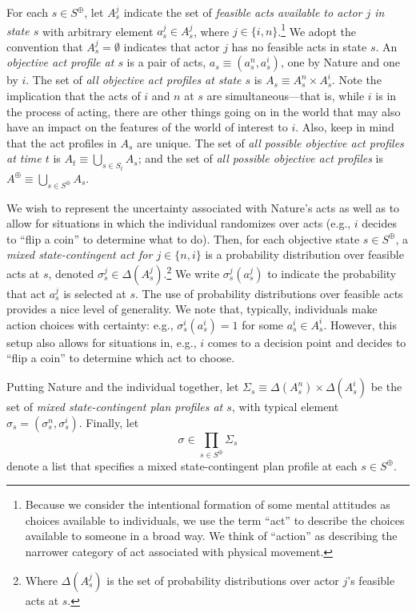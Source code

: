 \documentclass[
11pt,
titlepage,
reqno,
]{article}%
\theoremstyle{definition}
\begin{document}
For each  $s\in S^\oplus$, let $A^j_s$ indicate the set of \textit{feasible acts available to actor $j$ in state $s$} with arbitrary element $a^j_s\in A^j_s$, where $j\in\{i,n\}$.\footnote
{
	Because we consider the intentional formation of some mental attitudes as choices available to individuals, we use the term ``act'' to describe the choices available to someone in a broad way.
	We think of ``action'' as describing the narrower category of act associated with physical movement.
} 
We adopt the convention that $A^j_s=\emptyset$ indicates that actor $j$ has no feasible acts in state $s$.
An \textit{objective act profile at $s$}  is a pair of acts, $a_s\equiv(a^n_s,a^i_s)$, one by Nature and one by $i$. 
The set of \textit{all objective act profiles at state $s$} is $A_s\equiv A^n_s\times A^i_s$.
Note the implication that the acts of $i$ and $n$ at $s$ are simultaneous---that is, while $i$ is in the process of acting, there are other things going on in the world that may also have an impact on the features of the world of interest to $i$.
Also, keep in mind that the act profiles in $A_s$ are unique.
The set of \textit{all possible objective act profiles at time $t$} is  $A_t\equiv \bigcup_{s\in S_t} A_s$; and the set of \textit{all possible objective act profiles} is $A^\oplus\equiv \bigcup_{s\in S^\oplus} A_s$. 
 
 We wish to represent the uncertainty associated with Nature's acts as well as to allow for situations in which the individual randomizes over acts (e.g., $i$ decides to ``flip a coin'' to determine what to do).
 Then, for each objective state $s\in S^\oplus$, a \textit{mixed state-contingent act for $j\in\{n,i\}$} is a probability distribution over feasible acts at $s$, denoted $\sigma^j_s\in \Delta(A^j_{s})$.\footnote
 {
 	Where $\Delta(A^j_{s})$ is the set of probability distributions over actor $j$'s feasible acts at $s$. 
 } 
We write $\sigma^j_s(a^j_s)$ to indicate the probability that act $a^j_{s}$ is selected at $s$.
The use of probability distributions over feasible acts provides a nice level of generality.
We note that, typically, individuals make action choices with certainty: e.g., $\sigma^i_s(a^i_s) =1$ for some $a^i_s\in A^i_s$.
However, this setup also allows for situations in, e.g., $i$ comes to a decision point and decides to ``flip a coin'' to determine which act to choose.

Putting Nature and the individual together, let $\Sigma_s\equiv \Delta(A^n_{s})\times\Delta(A^i_{s})$ be the set of \textit{mixed state-contingent plan profiles at $s$}, with typical element $\sigma_s=(\sigma^n_s,\sigma^i_s)$. 
Finally, let 
\[
	\sigma\in\prod_{s\in S^\oplus}\Sigma_s
\]
denote a list that specifies a mixed state-contingent plan profile at each $s\in S^\oplus$.
\end{document}
